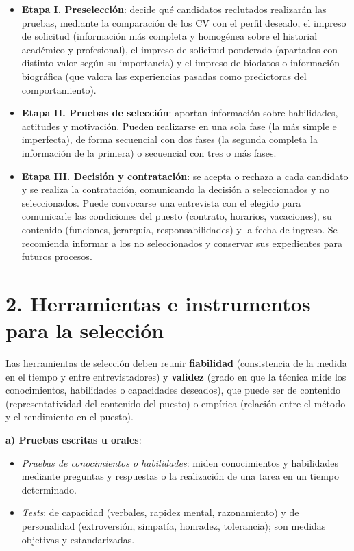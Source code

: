 \documentclass[12pt]{book} %
\providecommand{\tightlist}{%
  \setlength{\itemsep}{0pt}\setlength{\parskip}{0pt}}
\begin{document}
\begin{itemize}
\tightlist
\item
  \textbf{Etapa I. Preselección}: decide qué candidatos reclutados
  realizarán las pruebas, mediante la comparación de los CV con el
  perfil deseado, el impreso de solicitud (información más completa y
  homogénea sobre el historial académico y profesional), el impreso de
  solicitud ponderado (apartados con distinto valor según su
  importancia) y el impreso de biodatos o información biográfica (que
  valora las experiencias pasadas como predictoras del comportamiento).
\item
  \textbf{Etapa II. Pruebas de selección}: aportan información sobre
  habilidades, actitudes y motivación. Pueden realizarse en una sola
  fase (la más simple e imperfecta), de forma secuencial con dos fases
  (la segunda completa la información de la primera) o secuencial con
  tres o más fases.
\item
  \textbf{Etapa III. Decisión y contratación}: se acepta o rechaza a
  cada candidato y se realiza la contratación, comunicando la decisión a
  seleccionados y no seleccionados. Puede convocarse una entrevista con
  el elegido para comunicarle las condiciones del puesto (contrato,
  horarios, vacaciones), su contenido (funciones, jerarquía,
  responsabilidades) y la fecha de ingreso. Se recomienda informar a los
  no seleccionados y conservar sus expedientes para futuros procesos.
\end{itemize}

\hypertarget{herramientas-e-instrumentos-para-la-selecciuxf3n}{%
\section{2. Herramientas e instrumentos para la
selección}\label{herramientas-e-instrumentos-para-la-selecciuxf3n}}

Las herramientas de selección deben reunir \textbf{fiabilidad}
(consistencia de la medida en el tiempo y entre entrevistadores) y
\textbf{validez} (grado en que la técnica mide los conocimientos,
habilidades o capacidades deseados), que puede ser de contenido
(representatividad del contenido del puesto) o empírica (relación entre
el método y el rendimiento en el puesto).

\textbf{a) Pruebas escritas u orales}:

\begin{itemize}
\tightlist
\item
  \emph{Pruebas de conocimientos o habilidades}: miden conocimientos y
  habilidades mediante preguntas y respuestas o la realización de una
  tarea en un tiempo determinado.
\item
  \emph{Tests}: de capacidad (verbales, rapidez mental, razonamiento) y
  de personalidad (extroversión, simpatía, honradez, tolerancia); son
  medidas objetivas y estandarizadas.
\end{itemize}
\end{document}
